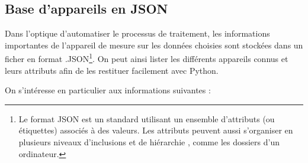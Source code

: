 \documentclass[12pt]{article}
\begin{document}
\newpage
\subsection{Base d'appareils en JSON} \label{2-app}

    Dans l'optique d'automatiser le processus de traitement, les informations importantes de l'appareil de mesure sur les données choisies sont stockées dans un ficher en format .JSON\footnote{Le format JSON est un standard utilisant un ensemble d'attributs (ou étiquettes) associés à des valeurs. Les attributs peuvent aussi s'organiser en plusieurs niveaux d'inclusions et de hiérarchie , comme les dossiers d'un ordinateur.}. On peut ainsi lister les différents appareils connus et leurs attributs afin de les restituer facilement avec Python.

    On s'intéresse en particulier aux informations suivantes :
\end{document}
